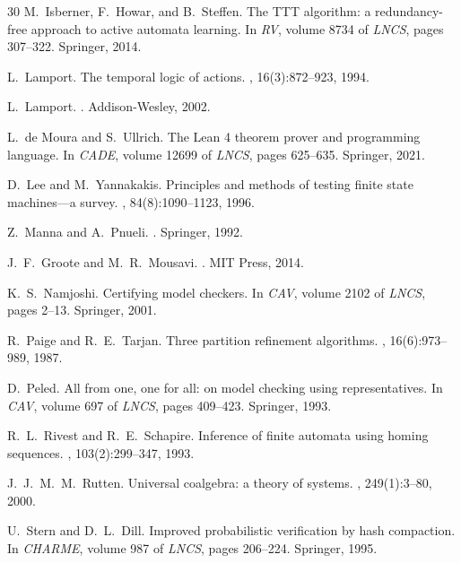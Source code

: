 \documentclass[11pt]{article}
\begin{document}
\begin{thebibliography}{30}
M.~Isberner, F.~Howar, and B.~Steffen.
\newblock The {TTT} algorithm: a redundancy-free approach to active automata
  learning.
\newblock In {\em RV}, volume 8734 of {\em LNCS}, pages 307--322. Springer,
  2014.

L.~Lamport.
\newblock The temporal logic of actions.
, 16(3):872--923, 1994.

L.~Lamport.
.
\newblock Addison-Wesley, 2002.

L.~de Moura and S.~Ullrich.
\newblock The {Lean 4} theorem prover and programming language.
\newblock In {\em CADE}, volume 12699 of {\em LNCS}, pages 625--635. Springer,
  2021.

D.~Lee and M.~Yannakakis.
\newblock Principles and methods of testing finite state machines---a survey.
, 84(8):1090--1123, 1996.

Z.~Manna and A.~Pnueli.
.
\newblock Springer, 1992.

J.~F.~Groote and M.~R.~Mousavi.
.
\newblock MIT Press, 2014.

K.~S.~Namjoshi.
\newblock Certifying model checkers.
\newblock In {\em CAV}, volume 2102 of {\em LNCS}, pages 2--13. Springer,
  2001.

R.~Paige and R.~E.~Tarjan.
\newblock Three partition refinement algorithms.
, 16(6):973--989, 1987.

D.~Peled.
\newblock All from one, one for all: on model checking using representatives.
\newblock In {\em CAV}, volume 697 of {\em LNCS}, pages 409--423. Springer,
  1993.

R.~L.~Rivest and R.~E.~Schapire.
\newblock Inference of finite automata using homing sequences.
, 103(2):299--347, 1993.

J.~J.~M.~M.~Rutten.
\newblock Universal coalgebra: a theory of systems.
, 249(1):3--80, 2000.

U.~Stern and D.~L.~Dill.
\newblock Improved probabilistic verification by hash compaction.
\newblock In {\em CHARME}, volume 987 of {\em LNCS}, pages 206--224.
  Springer, 1995.


\end{thebibliography}
\end{document}
